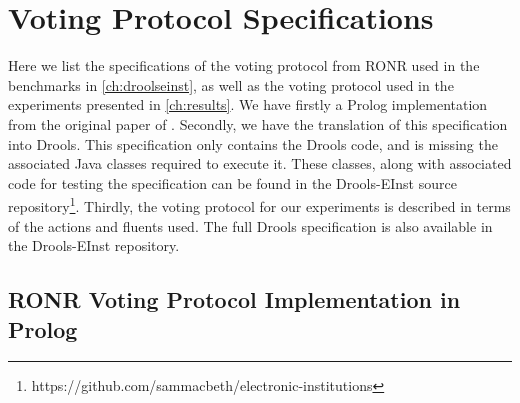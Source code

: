 
\chapter{Voting Protocol Specifications}

Here we list the specifications of the voting protocol from \ac{RONR} used in
the benchmarks in \autoref{ch:droolseinst}, as well as the voting protocol used 
in the experiments presented in \autoref{ch:results}. We have firstly a Prolog
implementation from the original paper of \citet{Pitt2005a}. Secondly, we have
the translation of this specification into Drools. This specification only
contains the Drools code, and is missing the associated Java classes required
to execute it. These classes, along with associated code for testing the
specification can be found in the Drools-EInst source
repository\footnote{https://github.com/sammacbeth/electronic-institutions}. Thirdly,
the voting protocol for our experiments is described in terms of the actions and fluents used. 
The full Drools specification is also available in the Drools-EInst repository.

\section{RONR Voting Protocol Implementation in Prolog}\label{sec:ronrcode}

